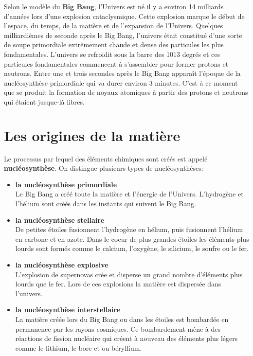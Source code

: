 \documentclass[
  11pt,
  a4paper,
  openany]{book}
\begin{document}
Selon le modèle du \textbf{Big Bang}, l'Univers est né il y a environ 14 milliards d'années lors d'une explosion cataclysmique. Cette explosion marque le début de l'espace, du temps, de la matière et de l'expansion de l'Univers. Quelques milliardièmes de seconde après le Big Bang, l'univers était constitué d'une sorte de soupe primordiale extrêmement chaude et dense des particules les plus fondamentales. L'univers se refroidit sous la barre des 1013 degrés et ces particules fondamentales commencent à s'assembler pour former protons et neutrons. Entre une et trois secondes après le Big Bang apparaît l'époque de la nucléosynthèse primordiale qui va durer environ 3 minutes. C'est à ce moment que se produit la formation de noyaux atomiques à partir des protons et neutrons qui étaient jusque-là libres.

\section{Les origines de la matière}\label{les-origines-de-la-matiuxe8re}

Le processus par lequel des éléments chimiques sont créés est appelé \textbf{nucléosynthèse}. On distingue plusieurs types de nucléosynthèses:

\begin{itemize}
\item
  \textbf{la nucléosynthèse primordiale}\\
  Le Big Bang a créé toute la matière et l'énergie de l'Univers. L'hydrogène et l'hélium sont créés dans les instants qui suivent le Big Bang.
\item
  \textbf{la nucléosynthèse stellaire}\\
  De petites étoiles fusionnent l'hydrogène en hélium, puis fusionnent l'hélium en carbone et en azote. Dans le coeur de plus grandes étoiles les éléments plus lourds sont formés comme le calcium, l'oxygène, le silicium, le soufre ou le fer.
\item
  \textbf{la nucléosynthèse explosive}\\
  L'explosion de supernovas crée et disperse un grand nombre d'éléments plus lourds que le fer. Lors de ces explosions la matière est dispersée dans l'univers.
\item
  \textbf{la nucléosynthèse interstellaire}\\
  La matière créée lors du Big Bang ou dans les étoiles est bombardée en permanence par les rayons cosmiques. Ce bombardement mène à des réactions de fission nucléaire qui créent à nouveau des éléments plus légers comme le lithium, le bore et ou béryllium.
\end{itemize}
\end{document}
